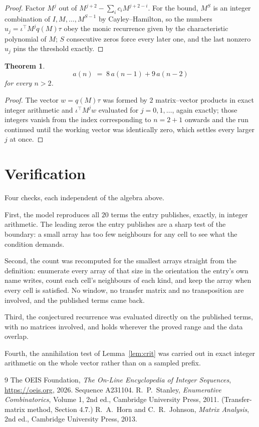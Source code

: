\documentclass[11pt,a4paper]{article}
\theoremstyle{plain}
\newtheorem{theorem}{Theorem}
\theoremstyle{definition}
\begin{document}
\begin{proof}
Factor $M^{j}$ out of $M^{j+2}-\sum_ic_iM^{j+2-i}$. For the bound, $M^{S}$
is an integer combination of $I,M,\dots,M^{S-1}$ by Cayley--Hamilton, so the numbers
$u_j=\iota^{\!\top}M^{j}q(M)\tau$ obey the monic recurrence given by the characteristic
polynomial of $M$; $S$ consecutive zeros force every later one, and the last nonzero $u_j$
pins the threshold exactly.
\end{proof}

\begin{theorem}
\[
a(n)\;=\;8\,a(n-1) + 9\,a(n-2)
\]
for every $n>2$.
\end{theorem}

\begin{proof}
The vector $w=q(M)\tau$ was formed by $2$ matrix--vector products in exact integer
arithmetic and $\iota^{\!\top}M^{j}w$ evaluated for $j=0,1,\dots$, again exactly; those
integers vanish from the index corresponding to $n=2+1$ onwards and the run continued
until the working vector was identically zero, which settles every larger $j$ at once.
\end{proof}

\section{Verification}

Four checks, each independent of the algebra above.

First, the model reproduces all $20$ terms the entry publishes, exactly, in integer
arithmetic. The leading zeros the entry publishes are a sharp test of the boundary: a small
array has too few neighbours for any cell to see what the condition demands.

Second, the count was recomputed for the smallest arrays straight from the definition:
enumerate every array of that size in the orientation the entry's own name writes, count each
cell's neighbours of each kind, and keep the array when every cell is satisfied. No window, no
transfer matrix and no transposition are involved, and the published terms came back.

Third, the conjectured recurrence was evaluated directly on the published terms, with no
matrices involved, and holds wherever the proved range and the data overlap.

Fourth, the annihilation test of Lemma~\ref{lem:crit} was carried out in exact integer
arithmetic on the whole vector rather than on a sampled prefix.

\begin{thebibliography}{9}
 The OEIS Foundation, \emph{The On-Line Encyclopedia of Integer
Sequences}, \url{https://oeis.org}, 2026. Sequence A231104.
 R.~P.~Stanley, \emph{Enumerative Combinatorics}, Volume 1, 2nd ed.,
Cambridge University Press, 2011. (Transfer-matrix method, Section 4.7.)
 R.~A.~Horn and C.~R.~Johnson, \emph{Matrix Analysis}, 2nd ed., Cambridge
University Press, 2013.
\end{thebibliography}
\end{document}
